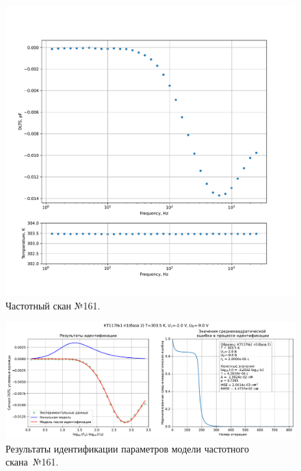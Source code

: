 \begin{figure}[!ht]
    \centering
    \includegraphics[width=1\textwidth]{../plots/КТ117№1_п1(база 2)_2500Гц-1Гц_1пФ_+30С_-2В-9В_200мВ_20мкс_шаг_0,1.pdf}
    \caption{Частотный скан №161.}
    \label{pic:frequency_scan_161}
\end{figure}

\begin{figure}[!ht]
    \centering
    \includegraphics[width=1\textwidth]{../plots/КТ117№1_п1(база 2)_2500Гц-1Гц_1пФ_+30С_-2В-9В_200мВ_20мкс_шаг_0,1_model.pdf}
    \caption{Результаты идентификации параметров модели частотного скана~№161.}
    \label{pic:frequency_scan_model161}
\end{figure}

\pagebreak


